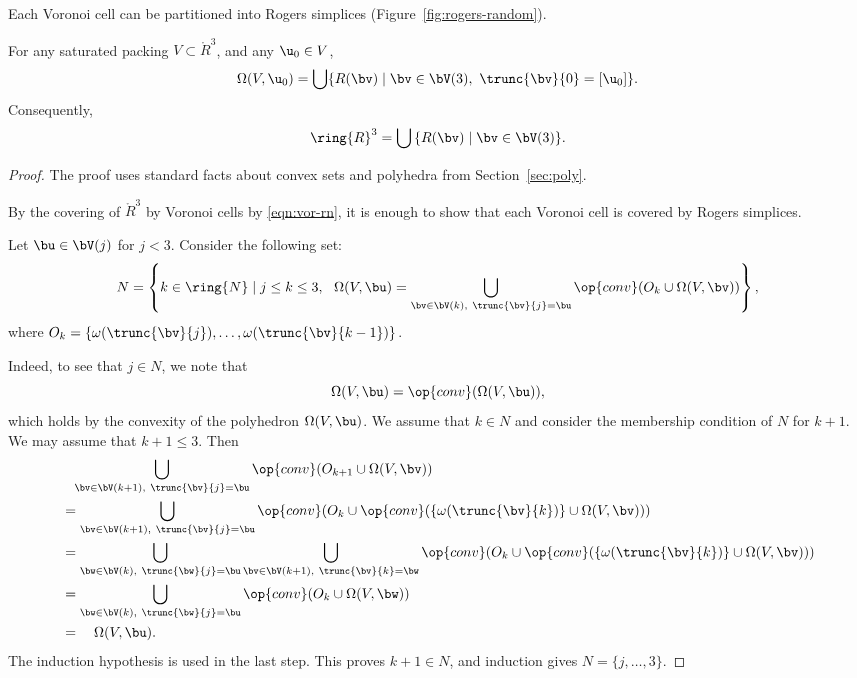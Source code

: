 Each Voronoi cell can be partitioned into Rogers simplices (Figure~\ref{fig:rogers-random}).

\figBUGZBTW %

\begin{lemma} 
\label{lemma:Rogers-d}
For any saturated packing $V\subset\ring{R}^3$, and any $\u_0\in V$,
\begin{equation} 
\Omega(V,\u_0) = \bigcup \{ R(\bv) \mid \bv\in \bV(3),~\trunc{\bv}{0} =[\u_0]\}.
\end{equation}
Consequently,
\[ 
\ring{R}^3 = \bigcup\, \{ R(\bv) \mid \bv\in\bV(3)\}.
\] 
\end{lemma}

\begin{proof} 
The proof uses standard facts about convex sets and polyhedra from
Section~\ref{sec:poly}.


%
By the covering of $\ring{R}^3$  by Voronoi cells by \eqref{eqn:vor-rn},
it is enough to show that each Voronoi cell is covered by Rogers
simplices.

Let $\bu\in \bV(j)$ for $j<3$.
Consider the following set:
\[  
N = \left\{k\in\ring{N}\mid j\le k\le 3, ~~\Omega(V,\bu) 
= \bigcup_{\bv \in \bV(k),~\trunc{\bv}{j}=\bu}
\op{conv}(O_k \cup\Omega(V,\bv)) %
\right\},
\] 
where $O_k = \{\omega(\trunc{\bv}{j}),\ldots,\omega(\trunc{\bv}{k-1})\}$.

  Indeed, to see that $j\in N$, we note that
\[  
\Omega(V,\bu) = \op{conv}(\Omega(V,\bu)),
\] 
which holds by the convexity of the polyhedron $\Omega(V,\bu)$.  We
assume that $k\in N$ and consider the membership condition of $N$ for
$k+1$.  We may assume that $k+1\le 3$.  Then
\begin{align*} 
&\phantom{=}\bigcup _{\bv \in \bV(k+1),~\trunc{\bv}{j}=\bu}
\op{conv}(O_{k+1} \cup\Omega(V,\bv))
%
\vspace{6pt}\\
&=\bigcup _{\bv \in \bV(k+1),~\trunc{\bv}{j}=\bu}
\op{conv}(O_{k} \cup\op{conv}(\{\omega(\trunc{\bv}{k})\}
\cup\Omega(V,\bv)))
\vspace{6pt}\\
&=\bigcup _{\bw\in \bV(k),~\trunc{\bw}{j}=\bu}
\bigcup_{\bv \in \bV(k+1),~\trunc{\bv}{k}=\bw}
\op{conv}(O_{k} \cup\op{conv}(\{\omega(\trunc{\bv}{k})\}
\cup\Omega(V,\bv)))
\vspace{6pt}\\
&=\bigcup _{\bw\in \bV(k),~\trunc{\bw}{j}=\bu}
\op{conv}(O_{k} \cup \Omega(V,\bw)    )
\vspace{6pt}\\
&=\quad\Omega(V,\bu).
\end{align*}
The induction hypothesis is used in the last step.  
This proves $k+1\in N$, and induction gives $N=\{j,\ldots,3\}$.


\end{proof}
